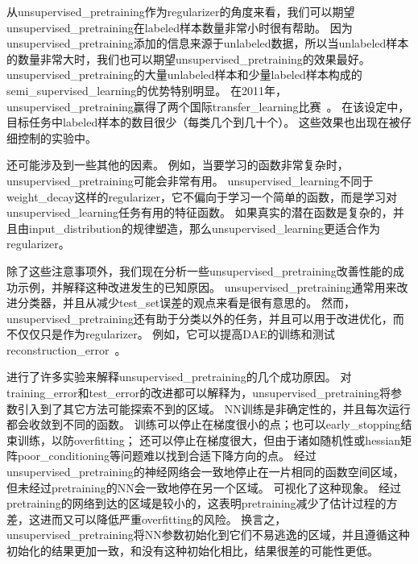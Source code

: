 从\gls{unsupervised_pretraining}作为\gls{regularizer}的角度来看，我们可以期望\gls{unsupervised_pretraining}在\gls{labeled}样本数量非常小时很有帮助。
因为\gls{unsupervised_pretraining}添加的信息来源于\gls{unlabeled}数据，所以当\gls{unlabeled}样本的数量非常大时，我们也可以期望\gls{unsupervised_pretraining}的效果最好。
\gls{unsupervised_pretraining}的大量\gls{unlabeled}样本和少量\gls{labeled}样本构成的\gls{semi_supervised_learning}的优势特别明显。
在2011年，\gls{unsupervised_pretraining}赢得了两个国际\gls{transfer_learning}比赛~\citep{UTLC+LISA-2011-small,goodfellow+all-NIPS2011}。
在该设定中，目标任务中\gls{labeled}样本的数目很少（每类几个到几十个）。
这些效果也出现在被\citet{paine2014analysis}仔细控制的实验中。


还可能涉及到一些其他的因素。
例如，当要学习的函数非常复杂时，\gls{unsupervised_pretraining}可能会非常有用。
\gls{unsupervised_learning}不同于\gls{weight_decay}这样的\gls{regularizer}，它不偏向于学习一个简单的函数，而是学习对\gls{unsupervised_learning}任务有用的特征函数。
如果真实的潜在函数是复杂的，并且由\gls{input_distribution}的规律塑造，那么\gls{unsupervised_learning}更适合作为\gls{regularizer}。


除了这些注意事项外，我们现在分析一些\gls{unsupervised_pretraining}改善性能的成功示例，并解释这种改进发生的已知原因。
\gls{unsupervised_pretraining}通常用来改进分类器，并且从减少\gls{test_set}误差的观点来看是很有意思的。
然而，\gls{unsupervised_pretraining}还有助于分类以外的任务，并且可以用于改进优化，而不仅仅只是作为\gls{regularizer}。
例如，它可以提高\gls{DAE}的训练和测试\gls{reconstruction_error}~\citep{Hinton-Science2006}。


\cite{Erhan+al-2010-small}进行了许多实验来解释\gls{unsupervised_pretraining}的几个成功原因。
对\gls{training_error}和\gls{test_error}的改进都可以解释为，\gls{unsupervised_pretraining}将参数引入到了其它方法可能探索不到的区域。
\gls{NN}训练是非确定性的，并且每次运行都会收敛到不同的函数。
训练可以停止在梯度很小的点；也可以\gls{early_stopping}结束训练，以防\gls{overfitting}；
还可以停止在梯度很大，但由于诸如随机性或\gls{hessian}矩阵\gls{poor_conditioning}等问题难以找到合适下降方向的点。
经过\gls{unsupervised_pretraining}的神经网络会一致地停止在一片相同的函数空间区域，但未经过\gls{pretraining}的\gls{NN}会一致地停在另一个区域。
可视化了这种现象。
经过\gls{pretraining}的网络到达的区域是较小的，这表明\gls{pretraining}减少了估计过程的方差，这进而又可以降低严重\gls{overfitting}的风险。
换言之，\gls{unsupervised_pretraining}将\gls{NN}参数初始化到它们不易逃逸的区域，并且遵循这种初始化的结果更加一致，和没有这种初始化相比，结果很差的可能性更低。

